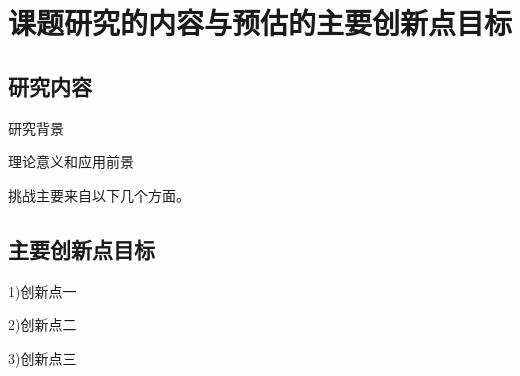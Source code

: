 \chapter{课题研究的内容与预估的主要创新点目标}\label{chap:introduction}

\section{研究内容}
研究背景\cite{he2016deep}

理论意义和应用前景

挑战主要来自以下几个方面。

\section{主要创新点目标}

1)创新点一

2)创新点二

3)创新点三

